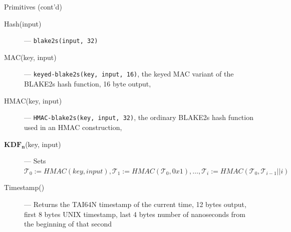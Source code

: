 \documentclass[xcolor=table]{beamer}
\begin{document}
    \begin{frame}{Primitives (cont'd)}
        \begin{description}
            \item[Hash(input)] --- \texttt{blake2s(input, 32)}
            \item[MAC(key, input)] --- \texttt{keyed-blake2s(key, input, 16)}, the keyed MAC variant of the BLAKE2s hash function, 16 byte output,
            \item[HMAC(key, input)] --- \texttt{HMAC-blake2s(key, input, 32)}, the ordinary BLAKE2s hash function used in an HMAC construction,
            \item[$\mathbf{KDF_n}$(key, input)] --- Sets \(\mathcal{T}_0 := HMAC(key, input), \mathcal{T}_1 := HMAC(\mathcal{T}_0, 0x1), \ldots, \mathcal{T}_i := HMAC(\mathcal{T}_0, \mathcal{T}_{i - 1} || i)\)
            \item[Timestamp()] --- Returns the TAI64N timestamp of the current time, 12 bytes output, first 8 bytes UNIX timestamp, last 4 bytes number of nanoseconds from the beginning of that second
        \end{description}
    \end{frame}
\end{document}
